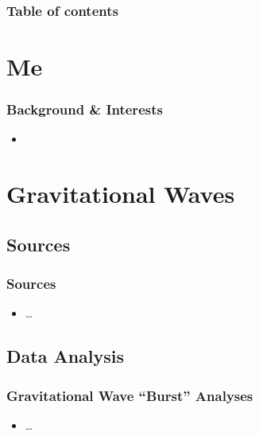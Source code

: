 \documentclass{beamer}
\begin{document}
\title{}
\subtitle{Gravitational Wave Bursts: Inferences Without (Many) Assumptions}  
\author{James A. Clark}
\date{} 

\begin{frame}[plain]
\titlepage
\end{frame}

\begin{frame}\frametitle{Table of contents}\tableofcontents
\end{frame} 

\section{Me}

\begin{frame}
    \frametitle{Background \& Interests}
    \begin{itemize}
        \item
    \end{itemize}
\end{frame}

\section{Gravitational Waves}

\begin{frame}
    \tableofcontents[currentsection]
\end{frame}


\subsection{Sources}
\begin{frame}
    \frametitle{Sources}
    \begin{itemize}
        \item \dots
    \end{itemize}
\end{frame}

\subsection{Data Analysis}
\begin{frame}
    \frametitle{Gravitational Wave ``Burst'' Analyses}
    \begin{itemize}
        \item \dots
    \end{itemize}
\end{frame}
\end{document}
